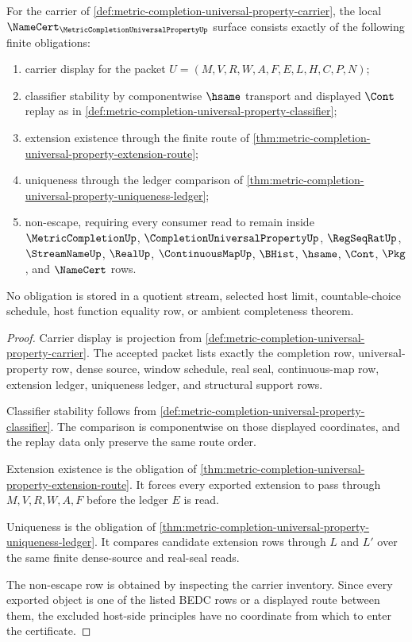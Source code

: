 \begin{theorem}
\label{thm:metric-completion-universal-property-namecert-obligations}
For the carrier of \autoref{def:metric-completion-universal-property-carrier}, the local $\NameCert_{\MetricCompletionUniversalPropertyUp}$ surface consists exactly of the following finite obligations:
\begin{enumerate}
\item carrier display for the packet $U=(M,V,R,W,A,F,E,L,H,C,P,N)$;
\item classifier stability by componentwise $\hsame$ transport and displayed $\Cont$ replay as in \autoref{def:metric-completion-universal-property-classifier};
\item extension existence through the finite route of \autoref{thm:metric-completion-universal-property-extension-route};
\item uniqueness through the ledger comparison of \autoref{thm:metric-completion-universal-property-uniqueness-ledger};
\item non-escape, requiring every consumer read to remain inside $\MetricCompletionUp$, $\CompletionUniversalPropertyUp$, $\RegSeqRatUp$, $\StreamNameUp$, $\RealUp$, $\ContinuousMapUp$, $\BHist$, $\hsame$, $\Cont$, $\Pkg$, and $\NameCert$ rows.
\end{enumerate}
No obligation is stored in a quotient stream, selected host limit, countable-choice schedule, host function equality row, or ambient completeness theorem.
\end{theorem}
\begin{proof}
Carrier display is projection from \autoref{def:metric-completion-universal-property-carrier}. The accepted packet lists exactly the completion row, universal-property row, dense source, window schedule, real seal, continuous-map row, extension ledger, uniqueness ledger, and structural support rows.

Classifier stability follows from \autoref{def:metric-completion-universal-property-classifier}. The comparison is componentwise on those displayed coordinates, and the replay data only preserve the same route order.

Extension existence is the obligation of \autoref{thm:metric-completion-universal-property-extension-route}. It forces every exported extension to pass through $M,V,R,W,A,F$ before the ledger $E$ is read.

Uniqueness is the obligation of \autoref{thm:metric-completion-universal-property-uniqueness-ledger}. It compares candidate extension rows through $L$ and $L'$ over the same finite dense-source and real-seal reads.

The non-escape row is obtained by inspecting the carrier inventory. Since every exported object is one of the listed BEDC rows or a displayed route between them, the excluded host-side principles have no coordinate from which to enter the certificate.
\end{proof}

